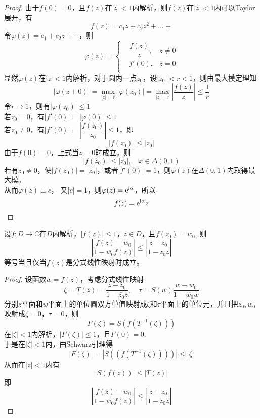 \begin{proof}
    
        
    由于$f(0) = 0$，且$f(z)$在$|z| < 1$内解析，则$f(z)$在$|z| < 1$内可以\textup{Taylor}展开，有
    $$f(z) = c_1 z + c_2 z^2 + \dots + $$
    令$\varphi(z) =  c_1 + c_2 z + \cdots $，则
    $$
    \varphi(z) = 
    \left\{
        \begin{aligned}
            & \dfrac{f(z)}{z}, & z \neq 0 \\
            &f'(0), & z = 0 \\
        \end{aligned}
    \right.
    $$
    显然$\varphi(z)$在$|z| < 1$内解析，对于圆内一点$z_0$，设$|z_0| < r < 1$，则由最大模定理知
    $$|\varphi(z + 0)| = \max_{|z| = r}|\varphi(z_0)| = \max_{|z| = r}{\left| \dfrac{f(z)}{z} \right|} \leq \dfrac{1}{r}$$
    令$r \to 1$，则有$|\varphi(z_0)| \leq 1$ \\
    若$z_0 = 0$，有$|f'(0)| = |\varphi(0)| \leq 1$ \\
    若$z_0 \neq 0$，有$|f'(0)| = \left| \dfrac{f(z_0)}{z_0} \right| \leq 1$，即
    $$|f(z_0)| \leq |z_0|$$
    由于$f(0) = 0$，上式当$z = 0$时成立，则
    $$|f(z_0)| \leq |z_0|, \quad x \in \Delta(0, 1)$$
    若有$z_0 \neq 0$，使$|f(z_0)| = |z_0| $，或者$|f'(0)| = 1$，则$\varphi(z)$在$\Delta(0, 1)$内取得最大模。\\
    从而$\varphi(z) \equiv c$， 又$|c| = 1$，则$\varphi(z) = \mathrm{e}^{\mathrm{i}\alpha}$，所以
    $$f(z) = \mathrm{e}^{\mathrm{i}\alpha}z$$

\end{proof}

\begin{theorem}

    设$f:D \to \mathbb{C}$在$D$内解析，$|f(z)| \leq 1$，$z \in D$，且$f(z_0) = w_0$. 则
    $$ \left| \dfrac{f(z) - w_0}{1 - \overline{w_0}f(z)} \right| \leq \left| \dfrac{z - z_0}{1 - z_0z} \right|$$
    等号当且仅当$f(z)$是分式线性映射时成立。

\end{theorem}

\begin{proof}
    
    设函数$w = f(z)$，考虑分式线性映射
    $$\zeta = T(z) = \dfrac{z - z_0}{1 - \overline{z_0}z}, \quad \tau = S(w) \dfrac{w - w_0}{1 - \overline{w_0}w}$$
    分别$z$平面和$w$平面上的单位圆双方单值映射成$\zeta$和$\tau$平面上的单位元，并且把$z_0, w_0$映射成$\zeta = 0$，$\tau = 0$，则
    $$F(\zeta) = S(f(T^{-1}(\zeta)))$$
    在$|\zeta| < 1$内解析，$|F(\zeta)| \leq 1$，且$F(0) = 0$. \\
    于是在$|\zeta| < 1$内，由\textup{Schwarz}引理得
    $$|F(\zeta)| = |S((f(T^{-1}(\zeta))))| \leq |\zeta|$$
    从而在$|z| < 1$内有
    $$|S(f(z))| \leq |T(z)|$$
    即
    $$ \left| \dfrac{f(z) - w_0}{1 - \overline{w_0}f(z)} \right| \leq \left| \dfrac{z - z_0}{1 - z_0z} \right|$$

\end{proof}